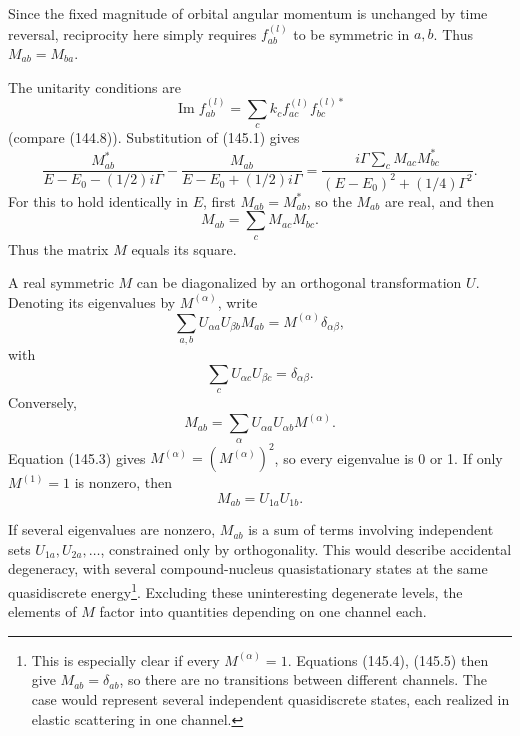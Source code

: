 Since the fixed magnitude of orbital angular momentum is unchanged by time
reversal, reciprocity here simply requires $f_{ab}^{(l)}$ to be symmetric in
$a,b$. Thus $M_{ab}=M_{ba}$.

The unitarity conditions are
\begin{equation}
 \operatorname{Im}f_{ab}^{(l)}=\sum_c k_c f_{ac}^{(l)}f_{bc}^{(l)*}
 \tag{145.2}
\end{equation}
(compare (144.8)). Substitution of (145.1) gives
\[
 \frac{M_{ab}^*}{E-E_0-(1/2)i\Gamma}
 -\frac{M_{ab}}{E-E_0+(1/2)i\Gamma}
 =\frac{i\Gamma\sum_c M_{ac}M_{bc}^*}
 {(E-E_0)^2+(1/4)\Gamma^2}.
\]
For this to hold identically in $E$, first $M_{ab}=M_{ab}^*$, so the
$M_{ab}$ are real, and then
\begin{equation}
 M_{ab}=\sum_c M_{ac}M_{bc}.
 \tag{145.3}
\end{equation}
Thus the matrix $M$ equals its square.

A real symmetric $M$ can be diagonalized by an orthogonal transformation
$U$. Denoting its eigenvalues by $M^{(\alpha)}$, write
\[
 \sum_{a,b}U_{\alpha a}U_{\beta b}M_{ab}=M^{(\alpha)}\delta_{\alpha\beta},
\]
with
\begin{equation}
 \sum_c U_{\alpha c}U_{\beta c}=\delta_{\alpha\beta}.
 \tag{145.4}
\end{equation}
Conversely,
\begin{equation}
 M_{ab}=\sum_\alpha U_{\alpha a}U_{\alpha b}M^{(\alpha)}.
 \tag{145.5}
\end{equation}
Equation (145.3) gives $M^{(\alpha)}=(M^{(\alpha)})^2$, so every eigenvalue is
0 or 1. If only $M^{(1)}=1$ is nonzero, then
\begin{equation}
 M_{ab}=U_{1a}U_{1b}.
 \tag{145.6}
\end{equation}

If several eigenvalues are nonzero, $M_{ab}$ is a sum of terms involving
independent sets $U_{1a},U_{2a},\ldots$, constrained only by orthogonality.
This would describe accidental degeneracy, with several compound-nucleus
quasistationary states at the same quasidiscrete energy\footnote{This is
especially clear if every $M^{(\alpha)}=1$. Equations (145.4), (145.5) then
give $M_{ab}=\delta_{ab}$, so there are no transitions between different
channels. The case would represent several independent quasidiscrete states,
each realized in elastic scattering in one channel.}. Excluding these
uninteresting degenerate levels, the elements of $M$ factor into quantities
depending on one channel each.

